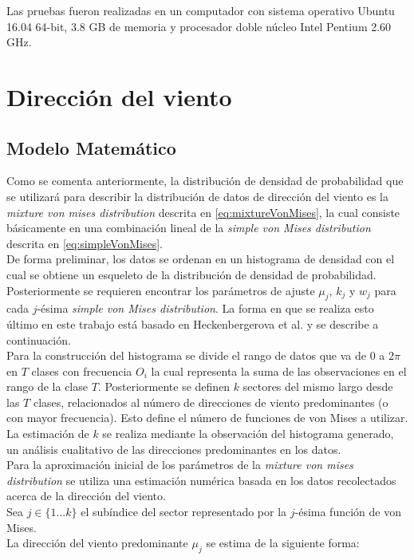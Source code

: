 Las pruebas fueron realizadas en un computador con sistema operativo Ubuntu 16.04 64-bit, 3.8 GB de memoria y procesador doble núcleo Intel Pentium 2.60 GHz. 

\section{Dirección del viento}
\subsection{Modelo Matemático} 
Como se comenta anteriormente, la distribución de densidad de probabilidad que se utilizará para describir la distribución de datos de dirección del viento
es la \emph{mixture von mises distribution} descrita en \ref{eq:mixtureVonMises}, la cual consiste básicamente en una combinación lineal de la \emph{simple von Mises distribution} descrita en \ref{eq:simpleVonMises}.\\ 
De forma preliminar, los datos se ordenan en un histograma de densidad con el cual se obtiene un esqueleto de la distribución de densidad de probabilidad. Posteriormente se requieren encontrar los parámetros de ajuste $\mu_j$, $k_j$ y $w_j$ para cada $j$-ésima \emph{simple von Mises distribution}. La forma en que
se realiza esto último en este trabajo está basado en Heckenbergerova et al. \cite{Heckenbergerova15} y se describe a continuación.\\
Para la construcción del histograma se divide el rango de datos que va de 0 a $2\pi$ en $T$ clases con frecuencia $O_i$ la cual representa la suma de las observaciones en el rango de la clase $T$. Posteriormente se definen $k$ sectores del mismo largo desde las $T$ clases, relacionados al número de direcciones de viento predominantes (o con mayor frecuencia). Esto define el número de funciones de von Mises a utilizar. La estimación de $k$ se realiza mediante la observación del histograma generado, un análisis cualitativo de las direcciones predominantes en los datos.\\
Para la aproximación inicial de los parámetros de la \emph{mixture von mises distribution} se utiliza una estimación numérica basada en los datos recolectados acerca de la dirección del viento.\\
Sea $j \in \{1 ... k\}$ el subíndice del sector representado por la $j$-ésima función de von Mises.\\
La dirección del viento predominante $\mu_j$ se estima de la siguiente forma:

